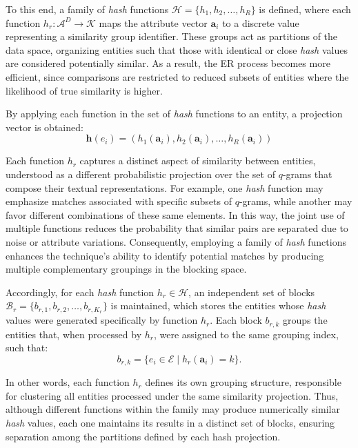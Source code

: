 \documentclass{ieeeaccess}
\begin{document}
To this end, a family of \textit{hash} functions \( \mathcal{H} = \{ h_1, h_2, \dots, h_R \} \) is defined, where each function \(h_r : \mathcal{A}^D \rightarrow \mathcal{K}\) maps the attribute vector \( \mathbf{a}_i \) to a discrete value representing a similarity group identifier. These groups act as partitions of the data space, organizing entities such that those with identical or close \textit{hash} values are considered potentially similar. As a result, the ER process becomes more efficient, since comparisons are restricted to reduced subsets of entities where the likelihood of true similarity is higher.

By applying each function in the set of \textit{hash} functions to an entity, a projection vector is obtained:
\[
\mathbf{h}(e_i) = (h_1(\mathbf{a}_i), h_2(\mathbf{a}_i), \dots, h_R(\mathbf{a}_i))
\]

Each function \( h_r \) captures a distinct aspect of similarity between entities, understood as a different probabilistic projection over the set of \(q\)-grams that compose their textual representations. For example, one \textit{hash} function may emphasize matches associated with specific subsets of \(q\)-grams, while another may favor different combinations of these same elements. In this way, the joint use of multiple functions reduces the probability that similar pairs are separated due to noise or attribute variations. Consequently, employing a family of \textit{hash} functions enhances the technique’s ability to identify potential matches by producing multiple complementary groupings in the blocking space.

Accordingly, for each \textit{hash} function \( h_r \in \mathcal{H} \), an independent set of blocks \(\mathcal{B}_r = \{ b_{r,1}, b_{r,2}, \dots, b_{r,K_r} \}\)
is maintained, which stores the entities whose \textit{hash} values were generated specifically by function \( h_r \). Each block \( b_{r,k} \) groups the entities that, when processed by \( h_r \), were assigned to the same grouping index, such that:
\[
    b_{r,k} =\{e_i \in \mathcal{E}\mid h_r(\mathbf{a}_i)=k \}.  
\]

In other words, each function \( h_r \) defines its own grouping structure, responsible for clustering all entities processed under the same similarity projection. Thus, although different functions within the family may produce numerically similar \textit{hash} values, each one maintains its results in a distinct set of blocks, ensuring separation among the partitions defined by each hash projection.
\end{document}
